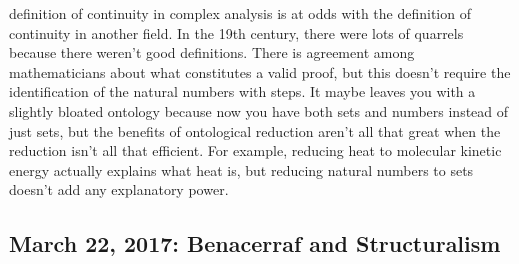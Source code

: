 \documentclass[12pt]{article}
\theoremstyle{definition}
\begin{document}
\begin{itemize}
        definition of continuity in complex analysis is at odds with the
        definition of continuity in another field. In the 19th century, there
        were lots of quarrels because there weren't good definitions. There is
        agreement among mathematicians about what constitutes a valid proof,
        but this doesn't require the identification of the natural numbers with
        steps. It maybe leaves you with a slightly bloated ontology because now
        you have both sets and numbers instead of just sets, but the benefits
        of ontological reduction aren't all that great when the reduction isn't
        all that efficient. For example, reducing heat to molecular kinetic
        energy actually explains what heat is, but reducing natural numbers to
        sets doesn't add any explanatory power. 

\end{itemize}

\subsection{March 22, 2017: Benacerraf and Structuralism}
\end{document}
